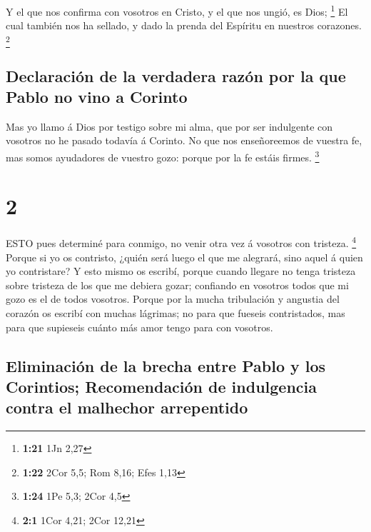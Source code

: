  Y el que nos confirma con vosotros en Cristo, y el que nos
ungió, es Dios; \footnote{\textbf{1:21} 1Jn 2,27}  El cual
también nos ha sellado, y dado la prenda del Espíritu en nuestros
corazones. \footnote{\textbf{1:22} 2Cor 5,5; Rom 8,16; Efes 1,13}

\hypertarget{declaraciuxf3n-de-la-verdadera-razuxf3n-por-la-que-pablo-no-vino-a-corinto}{%
\subsection{Declaración de la verdadera razón por la que Pablo no vino a
Corinto}\label{declaraciuxf3n-de-la-verdadera-razuxf3n-por-la-que-pablo-no-vino-a-corinto}}

 Mas yo llamo á Dios por testigo sobre mi alma, que por ser
indulgente con vosotros no he pasado todavía á Corinto.  No
que nos enseñoreemos de vuestra fe, mas somos ayudadores de vuestro
gozo: porque por la fe estáis firmes. \footnote{\textbf{1:24} 1Pe 5,3;
  2Cor 4,5}

\hypertarget{section-1}{%
\section{2}\label{section-1}}

 ESTO pues determiné para conmigo, no venir otra vez á
vosotros con tristeza. \footnote{\textbf{2:1} 1Cor 4,21; 2Cor 12,21}
 Porque si yo os contristo, ¿quién será luego el que me
alegrará, sino aquel á quien yo contristare?  Y esto mismo
os escribí, porque cuando llegare no tenga tristeza sobre tristeza de
los que me debiera gozar; confiando en vosotros todos que mi gozo es el
de todos vosotros.  Porque por la mucha tribulación y
angustia del corazón os escribí con muchas lágrimas; no para que fueseis
contristados, mas para que supieseis cuánto más amor tengo para con
vosotros.

\hypertarget{eliminaciuxf3n-de-la-brecha-entre-pablo-y-los-corintios-recomendaciuxf3n-de-indulgencia-contra-el-malhechor-arrepentido}{%
\subsection{Eliminación de la brecha entre Pablo y los Corintios;
Recomendación de indulgencia contra el malhechor
arrepentido}\label{eliminaciuxf3n-de-la-brecha-entre-pablo-y-los-corintios-recomendaciuxf3n-de-indulgencia-contra-el-malhechor-arrepentido}}

